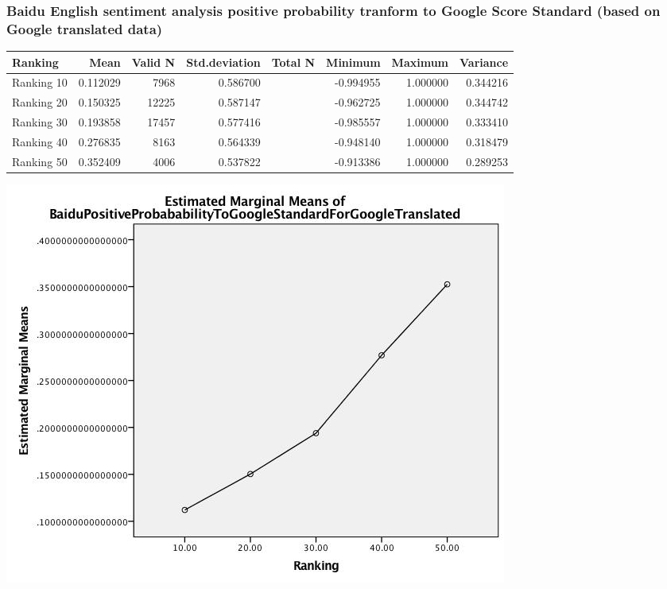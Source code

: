 \subsubsection{Baidu English sentiment analysis positive probability tranform to Google Score Standard (based on Google translated data)}
\label{sec:orge285725}
\begin{center}
\begin{tabular}{lrrrlrrr}
Ranking & Mean & Valid N & Std.deviation & Total N & Minimum & Maximum & Variance\\
\hline
Ranking 10 & 0.112029 & 7968 & 0.586700 &  & -0.994955 & 1.000000 & 0.344216\\
Ranking 20 & 0.150325 & 12225 & 0.587147 &  & -0.962725 & 1.000000 & 0.344742\\
Ranking 30 & 0.193858 & 17457 & 0.577416 &  & -0.985557 & 1.000000 & 0.333410\\
Ranking 40 & 0.276835 & 8163 & 0.564339 &  & -0.948140 & 1.000000 & 0.318479\\
Ranking 50 & 0.352409 & 4006 & 0.537822 &  & -0.913386 & 1.000000 & 0.289253\\
\end{tabular}
\end{center}

\begin{center}
\includegraphics[width=.9\linewidth]{./img/MarginalMeansOfBaiduPositiveProbabilityToGoogleStandardFroGoogleTranslatedData.jpg}
\end{center}

